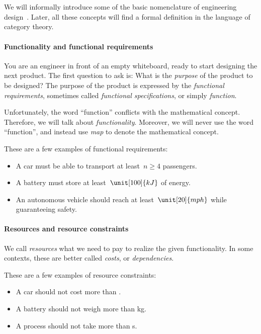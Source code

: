 \section{}

We will informally introduce some of the basic nomenclature of engineering
design~\cite{antonsson2005formal,deweck2011}.
Later, all these concepts will find a formal
definition in the language of category theory.

\paragraph{Functionality and functional requirements} You are an engineer in front of an empty whiteboard, ready to start designing the next product.
The first question to ask is: What is the \emph{purpose} of the product to be designed? The purpose of the product is expressed by the \emph{functional requirements}, sometimes called
\emph{functional specifications}, or simply \emph{function}.

Unfortunately, the word ``function'' conflicts with the mathematical concept. Therefore, we will talk about \emph{functionality}. Moreover, we will never use the word ``function'', and instead use \emph{map} to denote the mathematical concept.

\begin{example}
  These are a few examples of functional requirements:
  \begin{itemize}
    \item A car must be able to transport at least~$n \geq 4$ passengers.
    \item A battery must store at least~$\unit[100]{kJ}$ of energy.
    \item An autonomous vehicle should reach at least~$\unit[20]{mph}$ while guaranteeing safety.
  \end{itemize}
\end{example}

\paragraph{Resources and resource constraints}

We call \emph{resources} what we need to pay to realize the given functionality.
In some contexts, these are better called \emph{costs}, or \emph{dependencies}.


\begin{example}
  These are a few examples of resource constraints:
  \begin{itemize}
    \item A car should not cost more than \unit[15,000]{\stdcurr}.
    \item A battery should not weigh more than \unit[1]{kg}.
    \item A process should not take more than \unit[10]{s}.
  \end{itemize}
\end{example}

